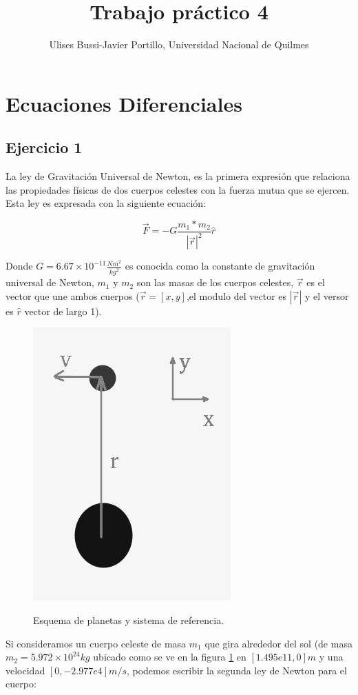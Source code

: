 \documentclass[a4paper,11pt]{article}
\makeatletter
\theoremstyle{mytheor}
\renewcommand{\maketitle}{
\colorbox{gray!20}{\framebox[\linewidth]{ \huge \textsc{\@title} } 
\lfoot{\@title}
}

}
\makeatother
\begin{document}
\title{Trabajo práctico 4}

\author{Ulises Bussi-Javier Portillo, Universidad Nacional de Quilmes}


\maketitle \vspace{20pt}



\section*{Ecuaciones Diferenciales}

\subsection*{Ejercicio 1}
La ley de Gravitación Universal de Newton, es la primera expresión que relaciona las propiedades físicas de dos cuerpos celestes con la fuerza mutua que se ejercen.  Esta ley es expresada con la siguiente ecuación:

\begin{equation*}
  \vec F = -G \frac{m_1 * m_2}{|\vec r|^2} \hat r
\end{equation*}

Donde $G=6.67\times10^{-11} \frac{N m^2}{{kg}^2} $ es conocida como la constante de gravitación universal de Newton, $m_1$ y $m_2$ son las masas de los cuerpos celestes, $\vec r$ es el vector que une ambos cuerpos ($\vec r = [x,y]$,el modulo del vector es $|\vec r|$ y el versor es $\hat r$ vector de largo 1).

\begin{figure}[h]
\centering
\includegraphics[width=.3\linewidth]{f1g.png}
\label{fig:f1}
\caption{Esquema de planetas y sistema de referencia.}

\end{figure}


Si consideramos un cuerpo celeste de masa $m_1$ que gira alrededor del sol (de masa $m_2 = 5.972\times10^24kg$ ubicado como se ve en la figura \ref{fig:f1} en $[1.495e11 , 0]m$  y una velocidad $[0 ,-2.977e4]m/s$, podemos escribir la segunda ley de Newton para el cuerpo:
\end{document}
